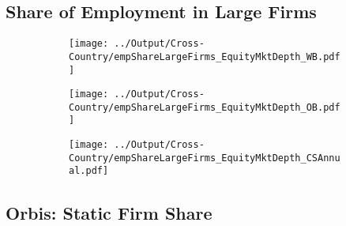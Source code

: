\documentclass[12pt,notitlepage]{article}
\begin{document}
\subsection{Share of Employment in Large Firms}
\begin{figure}[!htpb]
\centering
\begin{subfigure}{.49\textwidth}
    \centering
 \texttt{[image: ../Output/Cross-Country/empShareLargeFirms\_EquityMktDepth\_WB.pdf]}
\end{subfigure}
\begin{subfigure}{.49\textwidth}
    \centering
  \texttt{[image: ../Output/Cross-Country/empShareLargeFirms\_EquityMktDepth\_OB.pdf]}
\end{subfigure}
\begin{subfigure}{.49\textwidth}
    \centering
  \texttt{[image: ../Output/Cross-Country/empShareLargeFirms\_EquityMktDepth\_CSAnnual.pdf]}
\end{subfigure}
\end{figure}

\clearpage




\subsection{Orbis: Static Firm Share}

\begin{table}[!htpb]
\end{table}


\clearpage
\end{document}
